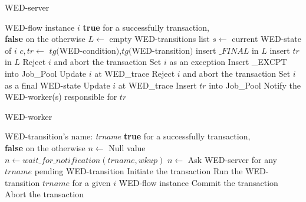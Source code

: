 \documentclass[conference]{IEEEtran}
\begin{document}
\begin{algorithm}
\caption{WED-server}
\label{alg1}
\begin{algorithmic}[1]
\REQUIRE WED-flow instance $i$
\ENSURE \textbf{true} for a successfully transaction,\\
         \hspace{23pt}\textbf{false} on the otherwise
\STATE $L \leftarrow$ empty WED-transitions list 
\STATE $s \leftarrow$ current WED-state of $i$
\STATE $c,tr \leftarrow$ $tg($WED-condition$)$,$tg($WED-transition$)$
\STATE insert $\_FINAL$ in $L$
\ELSE
\STATE insert $tr$ in $L$
\ENDIF
\ENDIF
\ENDFOR
{}
\STATE Reject $i$ and abort the transaction
\RETURN \FALSE
{}
\STATE Set $i$ as an exception
\STATE Insert \_EXCPT into Job\_Pool
\ENDIF
\STATE Update $i$ at WED\_trace
\RETURN \TRUE
{}
\STATE Reject $i$ and abort the transaction
\RETURN \FALSE
\ELSE
\STATE Set $i$ as a final WED-state
\STATE Update $i$ at WED\_trace
\RETURN \TRUE
\ENDIF
\ELSE
{}
\STATE Insert $tr$ into Job\_Pool
\STATE Notify the WED-worker(s) responsible for $tr$
\RETURN \TRUE
\ENDFOR
\ENDIF

\end{algorithmic}
\end{algorithm}

\begin{algorithm}
\caption{WED-worker}
\label{alg2}
\begin{algorithmic}[1]
\REQUIRE WED-transition's name: \emph{trname}
\ENSURE \textbf{true} for a successfully transaction,\\
         \hspace{23pt}\textbf{false} on the otherwise
\LOOP
\STATE $n \leftarrow$ Null value
\STATE $n \leftarrow wait\_for\_notification(trname,wkup)$
\STATE $n \leftarrow $ Ask WED-server for any $trname$ pending WED-transition
\ENDIF
\ENDWHILE
\STATE Initiate the transaction
\STATE Run the WED-transition $trname$ for a given $i$ WED-flow instance
\STATE Commit the transaction
\RETURN \TRUE
\ELSE
\STATE Abort the transaction
\RETURN \FALSE
\ENDIF  
\ENDLOOP

\end{algorithmic}
\end{algorithm}
\end{document}
